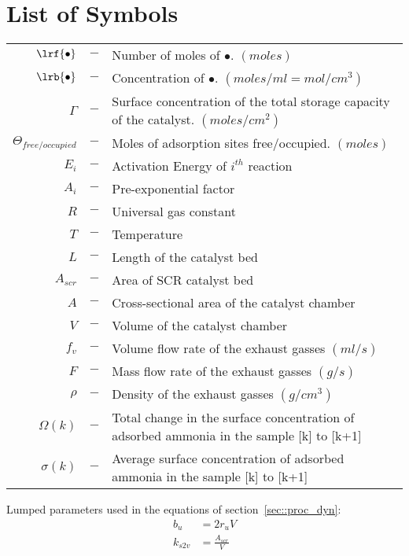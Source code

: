 \section*{List of Symbols}

\begin{table}[H]
    \begin{tabular}{r c l}
        $\lrf{\bullet}$ &$-$& Number of moles of $\bullet$. $(moles)$\\
        $\lrb{\bullet}$ &$-$& Concentration of $\bullet$. $(moles/ml = mol/cm^3)$\\
        $\Gamma$ &$-$& Surface concentration of the total storage capacity of the catalyst. $(moles/cm^2)$\\
        $\Theta_{free/occupied}$ &$-$& Moles of adsorption sites free/occupied. $(moles)$\\
        $E_i$ &$-$& Activation Energy of $i^{th}$ reaction\\
        $A_i$ &$-$& Pre-exponential factor\\
        $R$ &$-$& Universal gas constant\\
        $T$ &$-$& Temperature\\
        $L$ &$-$& Length of the catalyst bed\\
        $A_{scr}$ &$-$& Area of SCR catalyst bed\\
        $A$ &$-$& Cross-sectional area of the catalyst chamber\\
        $V$ &$-$& Volume of the catalyst chamber\\
        $f_v$ &$-$& Volume flow rate of the exhaust gasses $(ml/s)$\\
        $F$ &$-$& Mass flow rate of the exhaust gasses $(g/s)$\\
        $\rho$ &$-$& Density of the exhaust gasses $(g/cm^3)$\\
        $\Omega(k)$ &$-$& Total change in the surface concentration of
        adsorbed ammonia in the sample [k] to [k+1]\\
        $\sigma(k)$ &$-$& Average surface concentration of adsorbed ammonia in the
        sample [k] to [k+1]\\
    \end{tabular}
\end{table}

Lumped parameters used in the equations of section~\ref{sec::proc_dyn}:
\begin{align*}
    b_u &= 2r_u V\\
    k_{s2v} &= \frac{A_{scr}}{V}\\
\end{align*}
